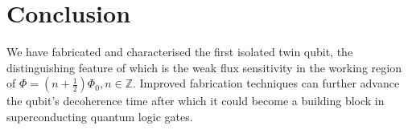 \section{Conclusion}
 
 \vspace{-1em}
 
 \noindent We have fabricated and characterised the first isolated twin qubit, the distinguishing feature of which is the weak flux sensitivity in the working region of $ \Phi = (n+\frac{1}{2})\Phi_0, n\in\mathbb{Z} $. Improved fabrication techniques can further advance the qubit's decoherence time after which it could become a building block in superconducting quantum logic gates.